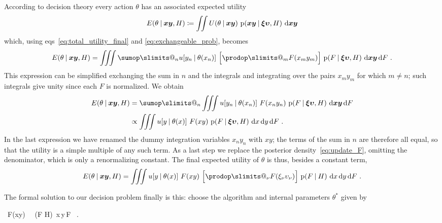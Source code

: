 \documentclass[\ifafour a4paper,12pt,\else a5paper,10pt,\fi%
onecolumn,oneside,article,%
british%
]{memoir}
\makeatletter
\newcommand*{\widefbox}[1]{\fbox{\hspace{1em}#1\hspace{1em}}}
\theoremstyle{remark}
\theoremstyle{innote}
\def\sum{\DOTSI\sumop\slimits@}
\def\prod{\DOTSI\prodop\slimits@}
\newcommand*{\di}{\mathrm{d}}%
\newcommand*{\defd}{\coloneqq}
\newcommand*{\p}{\mathrm{p}}%
\renewcommand*{\|}[1][]{\nonscript\:#1\vert\nonscript\:\mathopen{}}
\renewcommand*{\=}{\TextOrMath\texteq\eq}
\newcommand*{\eqns}{eqs}%
\DeclareMathOperator*{\argsup}{arg\,sup}
\newcommand*{\yx}[1]{x_{#1}}
\newcommand*{\yy}[1]{y_{#1}}
\newcommand*{\bz}{\bm{xy}}
\newcommand*{\yxx}[1]{\xi_{#1}}
\newcommand*{\yyy}[1]{\upsilon_{#1}}
\newcommand*{\bzz}{\bm{\xi\upsilon}}
\newcommand*{\ctheta}{\theta^{*}}
\makeatother
\begin{document}
According to decision theory every action $\theta$ has an associated
expected utility
\begin{equation}
  \label{eq:exp_utility_theta}
  E(\theta \| \bz, H) 
\defd \iint U(\theta \| \bz) \ \p(\bz \| \bzz, H)\ \di\bz
\end{equation}
which, using \eqns~\eqref{eq:total_utility_final} and
\eqref{eq:exchangeable_prob}, becomes
\begin{equation}
  \label{eq:exp_utility_replace}
  E(\theta \| \bz, H) 
=\iiint \sum_{n} u[\yy{n} \| \theta(\yx{n})]\
    \Bigl[\prod_{m} F(\yx{m}\yy{m})\Bigr] \ \p(F \| \bzz, H)\ \di\bz\,\di F
    \ .
\end{equation}
This expression can be simplified exchanging the sum in $n$ and the integrals and
integrating over the pairs $\yx{m}\yy{m}$ for which $m \ne n$; such
integrals give unity since each $F$ is normalized. We obtain
\begin{equation}
  \label{eq:exp_utility_simple}
  \begin{split}
  E(\theta \| \bz, H) 
&= \sum_{n} \iiint u[\yy{n} \| \theta(\yx{n})] \
    F(\yx{n}\yy{n}) \ \p(F \| \bzz, H)\ \di\bz\,\di F
\\&\propto \iiint u[y \| \theta(x)] \
    F(xy) \ \p(F \| \bzz, H)\ \di x\,\di y\,\di F \ .
  \end{split}
\end{equation}
In the last expression we have renamed the dummy integration
variables $\yx{n}\yy{n}$ with $xy$; the terms of the sum in $n$ are
therefore all equal, so that the utility is a simple multiple of any such
term. As a last step we replace the posterior density~\eqref{eq:update_F},
omitting the denominator, which is only a renormalizing constant. The final
expected utility of $\theta$ is thus, besides a constant term,
\begin{equation}
  \label{eq:utility_final}
  E(\theta \| \bz, H) 
  = \iiint  u[y \| \theta(x)] \ F(xy) \
  \Bigl[\prod_{\nu}F(\yxx{\nu}\yyy{\nu})\Bigr] \
  \p(F \| H)\ \di x\,\di y\,\di F \ .
\end{equation}

The formal solution to our decision problem finally is this: choose the
algorithm and internal parameters $\ctheta$ given by
\begin{empheq}[box=\widefbox]{equation}
  \label{eq:argsup_choice}
  \ctheta \defd \argsup_{\theta}\!\!
  \iiint  u[y \| \theta(x)] \ F(xy) \
  \Bigl[\prod_{\nu}F(\yxx{\nu}\yyy{\nu})\Bigr] \
  \p(F \| H)\ \di x\,\di y\,\di F \ .
\end{empheq}
\end{document}
